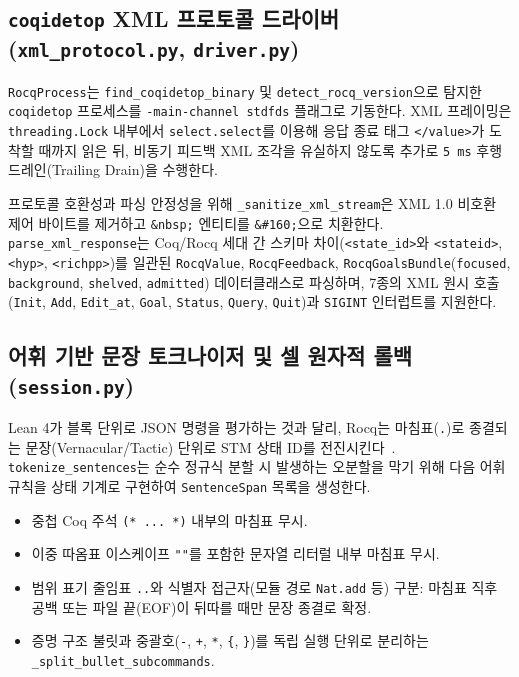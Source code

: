 \documentclass[journal]{IEEEtran}
\newcommand{\code}[1]{\texttt{#1}}
\begin{document}
\subsection{\code{coqidetop} XML 프로토콜 드라이버 (\code{xml\_protocol.py}, \code{driver.py})}
\code{RocqProcess}는 \code{find\_coqidetop\_binary} 및 \code{detect\_rocq\_version}으로 탐지한 \code{coqidetop} 프로세스를 \code{-main-channel stdfds} 플래그로 기동한다. XML 프레이밍은 \code{threading.Lock} 내부에서 \code{select.select}를 이용해 응답 종료 태그 \code{</value>}가 도착할 때까지 읽은 뒤, 비동기 피드백 XML 조각을 유실하지 않도록 추가로 \code{5\,ms} 후행 드레인(Trailing Drain)을 수행한다.

프로토콜 호환성과 파싱 안정성을 위해 \code{\_sanitize\_xml\_stream}은 XML 1.0 비호환 제어 바이트를 제거하고 \code{\&nbsp;} 엔티티를 \code{\&\#160;}으로 치환한다. \code{parse\_xml\_response}는 Coq/Rocq 세대 간 스키마 차이(\code{<state\_id>}와 \code{<stateid>}, \code{<hyp>}, \code{<richpp>})를 일관된 \code{RocqValue}, \code{RocqFeedback}, \code{RocqGoalsBundle}(\code{focused}, \code{background}, \code{shelved}, \code{admitted}) 데이터클래스로 파싱하며, 7종의 XML 원시 호출(\code{Init}, \code{Add}, \code{Edit\_at}, \code{Goal}, \code{Status}, \code{Query}, \code{Quit})과 \code{SIGINT} 인터럽트를 지원한다.

\subsection{어휘 기반 문장 토크나이저 및 셀 원자적 롤백 (\code{session.py})}
Lean 4가 블록 단위로 JSON 명령을 평가하는 것과 달리, Rocq는 마침표(\code{.})로 종결되는 문장(Vernacular/Tactic) 단위로 STM 상태 ID를 전진시킨다~\cite{barras2015asynchronous}. \code{tokenize\_sentences}는 순수 정규식 분할 시 발생하는 오분할을 막기 위해 다음 어휘 규칙을 상태 기계로 구현하여 \code{SentenceSpan} 목록을 생성한다.
\begin{itemize}
  \item 중첩 Coq 주석 \code{(* ... *)} 내부의 마침표 무시.
  \item 이중 따옴표 이스케이프 \code{""}를 포함한 문자열 리터럴 내부 마침표 무시.
  \item 범위 표기 줄임표 \code{..}와 식별자 접근자(모듈 경로 \code{Nat.add} 등) 구분: 마침표 직후 공백 또는 파일 끝(EOF)이 뒤따를 때만 문장 종결로 확정.
  \item 증명 구조 불릿과 중괄호(\code{-}, \code{+}, \code{*}, \code{\{}, \code{\}})를 독립 실행 단위로 분리하는 \code{\_split\_bullet\_subcommands}.
\end{itemize}
\end{document}
